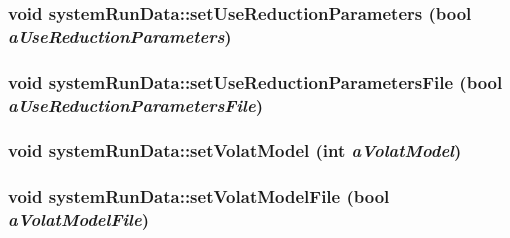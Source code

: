 \label{classsystem_run_data_a2c88cf333aed87dc98d1ba3d0b9339d8}
\hypertarget{classsystem_run_data_a517849010af7170de7125499a1c4805a}{
\subsubsection[{setUseReductionParameters}]{\setlength{\rightskip}{0pt plus 5cm}void systemRunData::setUseReductionParameters (bool {\em aUseReductionParameters})}}
\label{classsystem_run_data_a517849010af7170de7125499a1c4805a}
\hypertarget{classsystem_run_data_a096de4bf355cc68588125aea4a656dbe}{
\subsubsection[{setUseReductionParametersFile}]{\setlength{\rightskip}{0pt plus 5cm}void systemRunData::setUseReductionParametersFile (bool {\em aUseReductionParametersFile})}}
\label{classsystem_run_data_a096de4bf355cc68588125aea4a656dbe}
\hypertarget{classsystem_run_data_a785685ee46a6f4d0801fa42c0dbb591e}{
\subsubsection[{setVolatModel}]{\setlength{\rightskip}{0pt plus 5cm}void systemRunData::setVolatModel (int {\em aVolatModel})}}
\label{classsystem_run_data_a785685ee46a6f4d0801fa42c0dbb591e}
\hypertarget{classsystem_run_data_ade3ec857e52f5dc77f5389dedb28c32d}{
\subsubsection[{setVolatModelFile}]{\setlength{\rightskip}{0pt plus 5cm}void systemRunData::setVolatModelFile (bool {\em aVolatModelFile})}}
